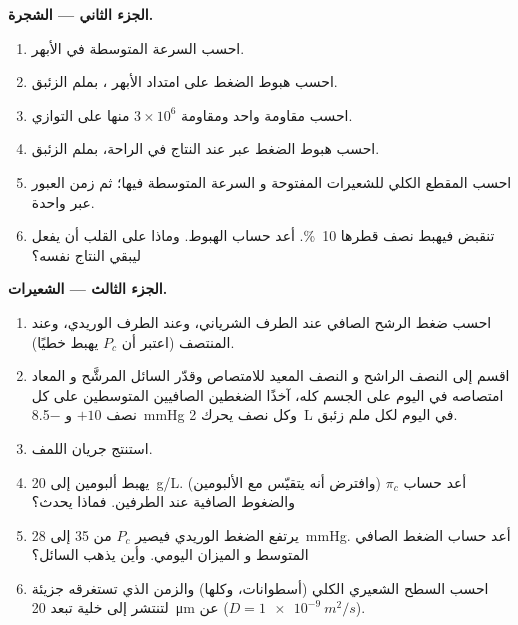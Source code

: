 \begin{problem}
\medskip
\noindent\textbf{الجزء الثاني --- الشجرة.}
\begin{enumerate}[resume]
  \item احسب السرعة المتوسطة في الأبهر.
  \item احسب هبوط الضغط على امتداد الأبهر ،
        بملم الزئبق.
  \item احسب مقاومة  واحد ومقاومة $3\times
        10^{6}$ منها على التوازي.
  \item احسب هبوط الضغط عبر  عند
        النتاج في الراحة، بملم الزئبق.
  \item احسب المقطع الكلي للشعيرات المفتوحة و
        السرعة المتوسطة فيها؛ ثم زمن العبور عبر واحدة.
  \item تنقبض  فيهبط نصف قطرها
        \qty{10}{\%}. أعد حساب الهبوط. وماذا على القلب أن يفعل
        ليبقي النتاج نفسه؟
\end{enumerate}

\medskip
\noindent\textbf{الجزء الثالث --- الشعيرات.}
\begin{enumerate}[resume]
  \item احسب ضغط الرشح الصافي عند الطرف الشرياني، وعند
        الطرف الوريدي، وعند المنتصف (اعتبر أن $P_c$ يهبط
        خطيًا).
  \item اقسم  إلى النصف الراشح و
        النصف المعيد للامتصاص وقدّر السائل المرشَّح و
        المعاد امتصاصه في اليوم على الجسم كله، آخذًا الضغطين
        الصافيين المتوسطين على كل نصف $+10$ و
        \qty{-8.5}{mmHg} وكل نصف يحرك \qty{2}{L} في اليوم لكل
        ملم زئبق.
  \item استنتج جريان اللمف.
  \item يهبط ألبومين  إلى \qty{20}{g/L}. أعد حساب $\pi_c$
        (وافترض أنه يتقيّس مع الألبومين) والضغوط الصافية عند
        الطرفين. فماذا يحدث؟
  \item يرتفع الضغط الوريدي فيصير $P_c$ من 35 إلى
        \qty{28}{mmHg}. أعد حساب الضغط الصافي المتوسط و
        الميزان اليومي. وأين يذهب السائل؟
  \item احسب السطح الشعيري الكلي (أسطوانات، وكلها)
        والزمن الذي تستغرقه جزيئة لتنتشر إلى خلية تبعد
        \qty{20}{\micro m} عن  ($D = \qty{1e-9}{m^2/s}$).
\end{enumerate}


\end{problem}
